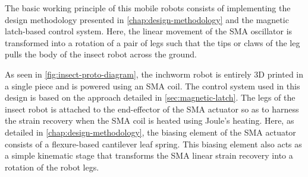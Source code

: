 The basic working principle of this mobile robots consists of implementing the design methodology presented in \cref{chap:design-methodology} and the magnetic latch-based control system. Here, the linear movement of the SMA oscillator is transformed into a rotation of a pair of legs such that the tips or claws of the leg pulls the body of the insect robot across the ground.

As seen in \cref{fig:insect-proto-diagram}, the inchworm robot is entirely 3D printed in a single piece and is powered using an SMA coil. The control system used in this design is based on the approach detailed in \cref{sec:magnetic-latch}. The legs of the insect robot is attached to the end-effector of the SMA actuator so as to harness the strain recovery when the SMA coil is heated using Joule's heating. Here, as detailed in \cref{chap:design-methodology}, the biasing element of the SMA actuator consists of a flexure-based cantilever leaf spring. This biasing element also acts as a simple kinematic stage that transforms the SMA linear strain recovery into a rotation of the robot legs.

